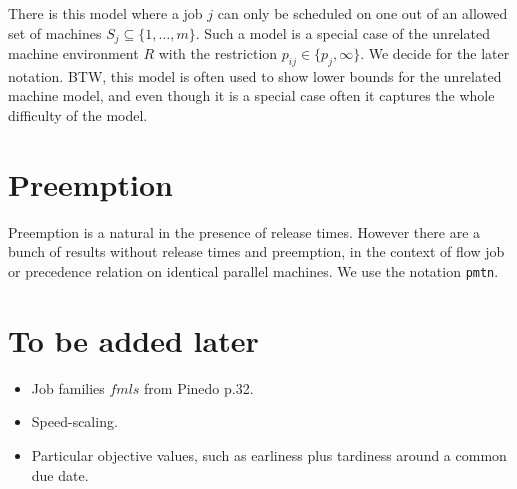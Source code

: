 \documentclass{article}
\begin{document}
There is this model where a job $j$ can only be scheduled on one out of an allowed set of machines $S_j\subseteq \{1,\ldots,m\}$.  Such a model is a special case of the unrelated machine environment $R$ with the restriction $p_{ij}\in\{p_j,\infty\}$.  We decide for the later notation.  BTW, this model is often used to show lower bounds for the unrelated machine model, and even though it is a special case often it captures the whole difficulty of the model.

\section{Preemption}

Preemption is a natural in the presence of release times. However there are a bunch of results without release times and preemption, in the context of flow job or precedence relation on identical parallel machines.  We use the notation \texttt{pmtn}.

\section{To be added later}

\begin{itemize}
\item Job families $fmls$  from Pinedo p.32.

\item Speed-scaling.

\item Particular objective values, such as earliness plus tardiness around a common due date.
\end{itemize}
\end{document}
